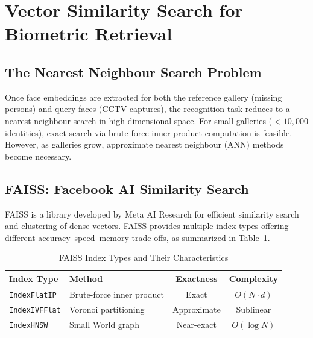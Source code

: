 \documentclass[12pt, a4paper]{article}
\begin{document}
\section{Vector Similarity Search for Biometric Retrieval}

\subsection{The Nearest Neighbour Search Problem}

Once face embeddings are extracted for both the reference gallery (missing persons) and query faces (CCTV captures), the recognition task reduces to a nearest neighbour search in high-dimensional space. For small galleries ($< 10{,}000$ identities), exact search via brute-force inner product computation is feasible. However, as galleries grow, approximate nearest neighbour (ANN) methods become necessary.

\subsection{FAISS: Facebook AI Similarity Search}

FAISS \cite{johnson2021} is a library developed by Meta AI Research for efficient similarity search and clustering of dense vectors. FAISS provides multiple index types offering different accuracy--speed--memory trade-offs, as summarized in Table~\ref{tab:faiss_indices}.

\begin{table}[H]
    \centering
    \caption{FAISS Index Types and Their Characteristics}
    \label{tab:faiss_indices}
    \begin{tabular}{llcc}
        \toprule
        \textbf{Index Type} & \textbf{Method} & \textbf{Exactness} & \textbf{Complexity} \\
        \midrule
        \texttt{IndexFlatIP} & Brute-force inner product & Exact & $O(N \cdot d)$ \\
        \texttt{IndexIVFFlat} & Voronoi partitioning & Approximate & Sublinear \\
        \texttt{IndexHNSW} & Small World graph & Near-exact & $O(\log N)$ \\
        \bottomrule
    \end{tabular}
\end{table}
\end{document}
